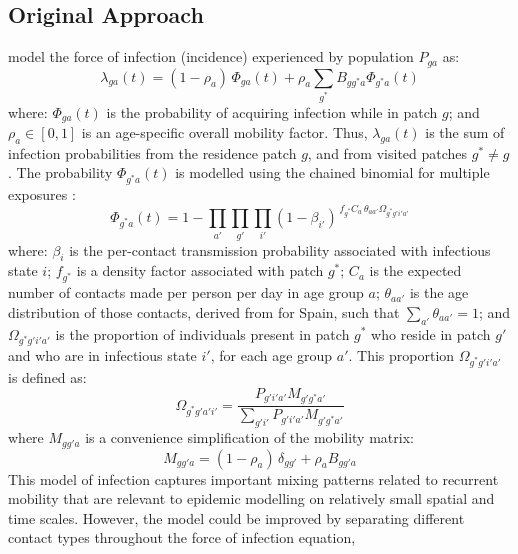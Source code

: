 \subsection{Original Approach}\label{meth.orig}
\citet{Arenas2020} model the force of infection (incidence) experienced by population $P_{ga}$ as:
\begin{equation}\label{eq:Arenas.lambda}
  \lambda_{ga}(t) = (1-\rho_a)\,\Phi_{ga}(t) + \rho_a \sum_{g^*} B_{gg^*a} \Phi_{g^*a}(t)
\end{equation}
where:
$\Phi_{ga}(t)$ is the probability of acquiring infection while in patch $g$;
and $\rho_{a} \in [0,1]$ is an age-specific overall mobility factor.
Thus, $\lambda_{ga}(t)$ is the sum of infection probabilities
from the residence patch $g$, and from visited patches $g^* \ne g$.
The probability $\Phi_{g^*a}(t)$ is modelled using
the chained binomial for multiple exposures \cite{Kaplan1990}:
\begin{equation}\label{eq:Arenas.Phi}
  \Phi_{g^*a}(t) = 1 - \prod_{a'}\prod_{g'} \prod_{i'} {\left(1 - \beta_{i'}\right)}
    ^{\,f_{g^*}C_a\,\theta_{aa'} \Omega_{g^*g'i'a'}}
\end{equation}
where:
$\beta_i$ is the per-contact transmission probability associated with infectious state $i$;
$f_{g^*}$ is a density factor associated with patch $g^*$; %
$C_a$ is the expected number of contacts made per person per day in age group $a$;
$\theta_{aa'}$ is the age distribution of those contacts, derived from \cite{Prem2017} for Spain,
such that $\sum_{a'} \theta_{aa'} = 1$;
and $\Omega_{g^*g'i'a'}$ is the proportion of individuals present in patch $g^*$
who reside in patch $g'$ and who are in infectious state $i'$, for each age group $a'$.
This proportion $\Omega_{g^*g'i'a'}$ is defined as:
\begin{equation}\label{eq:Arenas.Omega}
  \Omega_{g^*g'a'i'} = \frac{P_{g'i'a'} M_{g'g^*a'}}{\sum_{g'i'} P_{g'i'a'} M_{g'g^*a'}}
\end{equation}
where $M_{gg'a}$ is a convenience simplification of the mobility matrix:
\begin{equation}\label{eq:Arenas.M}
  M_{gg'a} = (1-\rho_a)\,\delta_{gg'} + \rho_a B_{gg'a}
\end{equation}
This model of infection captures important mixing patterns related to recurrent mobility
that are relevant to epidemic modelling on relatively small spatial and time scales.
However, the model could be improved by
separating different contact types throughout the force of infection equation,
